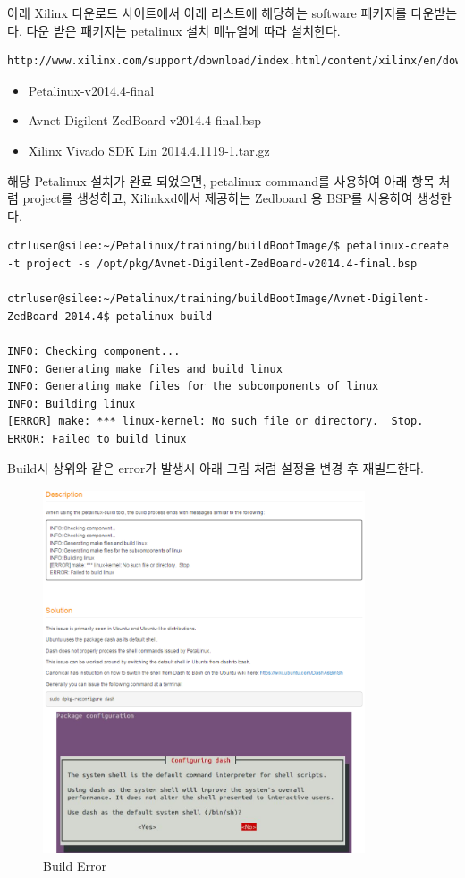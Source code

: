 \documentclass[11pt
  , a4paper
  , article
  , oneside
]{memoir}
\begin{document}
아래 Xilinx 다운로드 사이트에서 아래 리스트에 해당하는 software 패키지를 다운받는다. 다운 받은 패키지는 petalinux 설치 메뉴얼에 따라 설치한다.

\begin{lstlisting}[style=termstyle]
http://www.xilinx.com/support/download/index.html/content/xilinx/en/downloadNav/petalinux.html
\end{lstlisting}


\begin{itemize}
	\item Petalinux-v2014.4-final
	\item Avnet-Digilent-ZedBoard-v2014.4-final.bsp
	\item Xilinx Vivado SDK Lin 2014.4.1119-1.tar.gz
\end{itemize}

해당 Petalinux 설치가 완료 되었으면, petalinux command를 사용하여 아래 항목 처럼 project를 생성하고, Xilinkxd에서 제공하는 Zedboard 용 BSP를 사용하여 생성한다.

\begin{lstlisting}[style=termstyle]
ctrluser@silee:~/Petalinux/training/buildBootImage/$ petalinux-create -t project -s /opt/pkg/Avnet-Digilent-ZedBoard-v2014.4-final.bsp
 
ctrluser@silee:~/Petalinux/training/buildBootImage/Avnet-Digilent-ZedBoard-2014.4$ petalinux-build 

INFO: Checking component...
INFO: Generating make files and build linux
INFO: Generating make files for the subcomponents of linux
INFO: Building linux
[ERROR] make: *** linux-kernel: No such file or directory.  Stop.
ERROR: Failed to build linux
\end{lstlisting}

Build시 상위와 같은 error가 발생시 아래 그림 처럼 설정을 변경 후 재빌드한다.

\clearpage
\begin{figure}[h!]
	\centering
	\includegraphics[width=0.85\textwidth]{./images/petalinux-build_error_solve.eps}
	\caption{Build Error}
	\label{fig:build_error} 
\end{figure}
\end{document}
